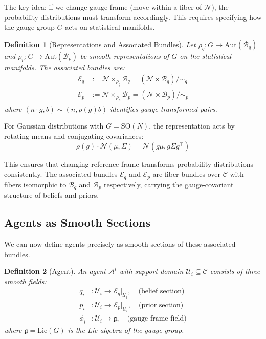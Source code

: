 \documentclass[11pt]{article}
\newtheorem{definition}{Definition}
\begin{document}
The key idea: if we change gauge frame (move within a fiber of $\mathcal{N}$), the probability distributions must transform accordingly. This requires specifying how the gauge group $G$ acts on statistical manifolds.

\begin{definition}[Representations and Associated Bundles]
Let $\rho_q: G \to \mathrm{Aut}(\mathcal{B}_q)$ and $\rho_p: G \to \mathrm{Aut}(\mathcal{B}_p)$ be smooth representations of $G$ on the statistical manifolds. The associated bundles are:
\begin{align}
\mathcal{E}_q &:= \mathcal{N} \times_{\rho_q} \mathcal{B}_q = \left(\mathcal{N} \times \mathcal{B}_q\right)/{\sim_q} \\
\mathcal{E}_p &:= \mathcal{N} \times_{\rho_p} \mathcal{B}_p = \left(\mathcal{N} \times \mathcal{B}_p\right)/{\sim_p}
\end{align}
where $(n \cdot g, b) \sim (n, \rho(g)b)$ identifies gauge-transformed pairs.
\end{definition}

For Gaussian distributions with $G = \mathrm{SO}(N)$, the representation acts by rotating means and conjugating covariances:
\begin{equation}
\rho(g) \cdot \mathcal{N}(\mu, \Sigma) = \mathcal{N}(g\mu, g\Sigma g^\top)
\end{equation}

This ensures that changing reference frame transforms probability distributions consistently. The associated bundles $\mathcal{E}_q$ and $\mathcal{E}_p$ are fiber bundles over $\mathcal{C}$ with fibers isomorphic to $\mathcal{B}_q$ and $\mathcal{B}_p$ respectively, carrying the gauge-covariant structure of beliefs and priors.

\subsection{Agents as Smooth Sections}

We can now define agents precisely as smooth sections of these associated bundles.

\begin{definition}[Agent]
An agent $\mathcal{A}^i$ with support domain $\mathcal{U}_i \subseteq \mathcal{C}$ consists of three smooth fields:
\begin{align}
q_i &: \mathcal{U}_i \to \mathcal{E}_q|_{\mathcal{U}_i}, \quad \text{(belief section)} \\
p_i &: \mathcal{U}_i \to \mathcal{E}_p|_{\mathcal{U}_i}, \quad \text{(prior section)} \\
\phi_i &: \mathcal{U}_i \to \mathfrak{g}, \quad \text{(gauge frame field)}
\end{align}
where $\mathfrak{g} = \mathrm{Lie}(G)$ is the Lie algebra of the gauge group.
\end{definition}
\end{document}
